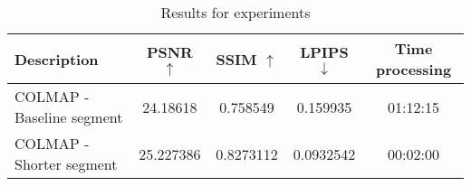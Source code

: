 \begin{table}[ht]
\centering
\setlength{\tabcolsep}{6pt}
\renewcommand{\arraystretch}{1.5}
\begin{tabular}{l | C{2.2} C{1.3} C{1.3} c}
\hline
\textbf{Description} & \textbf{PSNR $\uparrow$} & \textbf{SSIM $\uparrow$} & \textbf{LPIPS $\downarrow$} & \textbf{Time processing} \\
\hline
COLMAP - Baseline segment   & 24.18618  & 0.758549  & 0.159935  & 01:12:15 \\
COLMAP - Shorter segment    & 25.227386 & 0.8273112 & 0.0932542 & 00:02:00 \\
\hline
\end{tabular}
\caption{Results for experiments}
\label{tab:colmap-vs-poses}
\end{table}

\begin{comment}
\begin{table}[ht]
\centering
\setlength{\tabcolsep}{6pt}
\renewcommand{\arraystretch}{1.5}
\begin{tabular}{l | C{2.2} C{1.3} C{1.3} c}
\hline
\textbf{Description} & \textbf{PSNR $\uparrow$} & \textbf{SSIM $\uparrow$} & \textbf{LPIPS $\downarrow$} & \textbf{Time processing} \\
\hline
\multicolumn{5}{c}{Baseline segment} \\
\hline
CARLA w/o camera optimization & \cellcolor{green} 24.702831268310547 & \cellcolor{green} 0.7926456332206726 & \cellcolor{red} 0.17928948998451233  & 00:00:00 \\
CARLA w/ camera optimization & 24.197817 & 0.766733 & 0.168807 & 00:00:00 \\%
COLMAP & \cellcolor{red} 24.18618 & \cellcolor{red} 0.758549 & \cellcolor{green} 0.159935 & 01:12:15 \\%
\hline
\multicolumn{5}{c}{Shorter segment - 10\% of baseline} \\
\hline
CARLA w/o camera optimization &\cellcolor{green} 25.677803 & \cellcolor{green} 0.861634 & \cellcolor{green} 0.076989  & 00:00:00 \\
CARLA w/ camera optimization &\cellcolor{red} 24.831890 &\cellcolor{red} 0.824606 &\cellcolor{red} 0.102266 & 00:00:00 \\
COLMAP & 25.227386 & 0.8273112 & 0.0932542 & 00:02:00 \\
\hline
\end{tabular}
\caption{Results for experiments}
\label{tab:colmap-vs-poses}
\end{table}
\end{comment}


